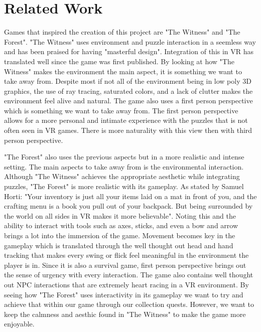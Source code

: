 \documentclass{vgtc}                          %
\begin{document}
\section{Related Work}
Games that inspired the creation of this project are "The Witness"\cite{rad_2016} and "The Forest"\cite{hafer_2018,horti_2018}. "The Witness" uses environment and puzzle interaction in a seemless way and has been praised for having "masterful design"\cite{rad_2016}.
Integration of this in VR has translated well since the game was first published. By looking at how "The Witness" makes the environment the main aspect, it is something we want to take away from. Despite most if not all of the environment being in low poly 3D graphics, the
use of ray tracing, saturated colors, and a lack of clutter makes the environment feel alive and natural. The game also uses a first person perspective which is something we want to take away from. The first person perspective allows for a more
personal and intimate experience with the puzzles that is not often seen in VR games. There is more naturality with this view then with third person perspective.

"The Forest" also uses the previous aspects but in a more realistic and intense setting. The main aspects to take away from is the environmental interaction. Although "The Witness" achieves the appropriate aesthetic while integrating puzzles, "The Forest"
is more realistic with its gameplay. As stated by Samuel Horti: "Your inventory is just all your items laid on a mat in front of you, and the crafting menu is a book you pull out of your backpack. But being surrounded by the world on all sides in VR makes it more believable"\cite{horti_2018}.
Noting this and the ability to interact with tools such as axes, sticks, and even a bow and arrow brings a lot into the immersion of the game. Movement becomes key in the gameplay which is translated through the well thought out head and hand tracking
that makes every swing or flick feel meaningful in the environment the player is in. Since it is also a survival game, first person perspective brings out the sense of urgency
with every interaction. The game also contains well thought out NPC interactions that are extremely heart racing in a VR environment. By seeing how "The Forest" uses interactivity in its gameplay we want to try and achieve that within our game through our collection
quests. However, we want to keep the calmness and aesthic found in "The Witness" to make the game more enjoyable.
\end{document}
